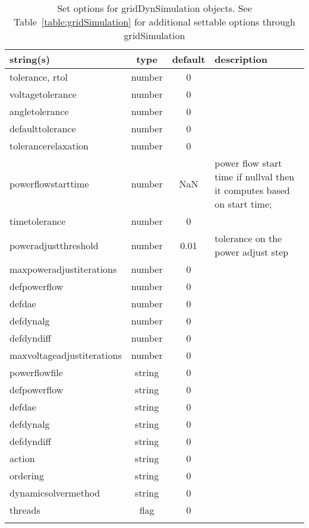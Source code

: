\begin{longtable}{p{5cm} c c p{7cm}}
string(s) & type & default & description \\
\hline
tolerance, rtol & number & 0 & \\
voltagetolerance & number & 0 & \\
angletolerance & number & 0 & \\
defaulttolerance & number & 0 & \\
tolerancerelaxation & number & 0 & \\
powerflowstarttime & number & NaN & power flow start time  if nullval then it computes based on start time;\\
timetolerance & number & 0 & \\
poweradjustthreshold & number & 0.01 & tolerance on the power adjust step\\
maxpoweradjustiterations & number & 0 & \\
defpowerflow & number & 0 & \\
defdae & number & 0 & \\
defdynalg & number & 0 & \\
defdyndiff & number & 0 & \\
maxvoltageadjustiterations & number & 0 & \\
powerflowfile & string & 0 & \\
defpowerflow & string & 0 & \\
defdae & string & 0 & \\
defdynalg & string & 0 & \\
defdyndiff & string & 0 & \\
action & string & 0 & \\
ordering & string & 0 & \\
dynamicsolvermethod & string & 0 & \\
threads & flag & 0 & \\
\hline
\caption{Set options for gridDynSimulation objects. See Table~\ref{table:gridSimulation} for additional settable options through gridSimulation}
\label{table:gridDynSimulation}
\end{longtable}

